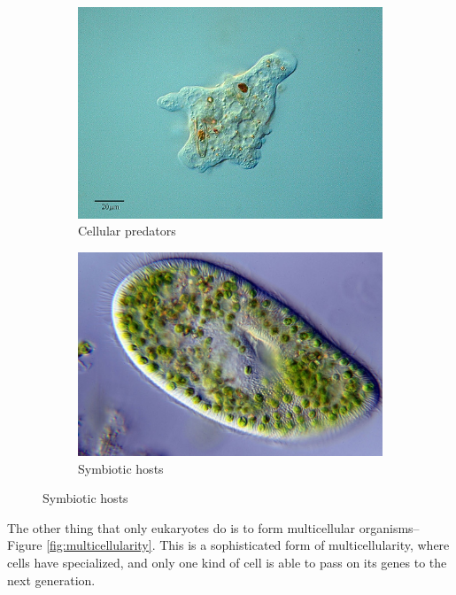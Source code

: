 \documentclass[]{article}
\begin{document}
\begin{figure}[H]
	\caption{Cellular predators, symbiotic hosts}
	\label{figs:Cellular:predators:symbiotic:hosts}
	\begin{subfigure}[b]{0.45\textwidth}
		\caption{ Cellular predators}
		\label{figs:Cellular:predators:symbiotic:hosts1}
		\includegraphics[width=\textwidth]{Eukaryotes1}
	\end{subfigure}
	\begin{subfigure}[b]{0.45\textwidth}
		\caption{Symbiotic hosts }
		\label{figs:Cellular:predators:symbiotic:hosts2}
		\includegraphics[width=\textwidth]{Eukaryotes2}
	\end{subfigure}
\end{figure}

The other thing that only eukaryotes do is to form multicellular organisms--Figure \ref{fig:multicellularity}. This is a sophisticated form of multicellularity, where cells have specialized, and only one kind of cell is able to pass on its genes to the next generation.
\end{document}
